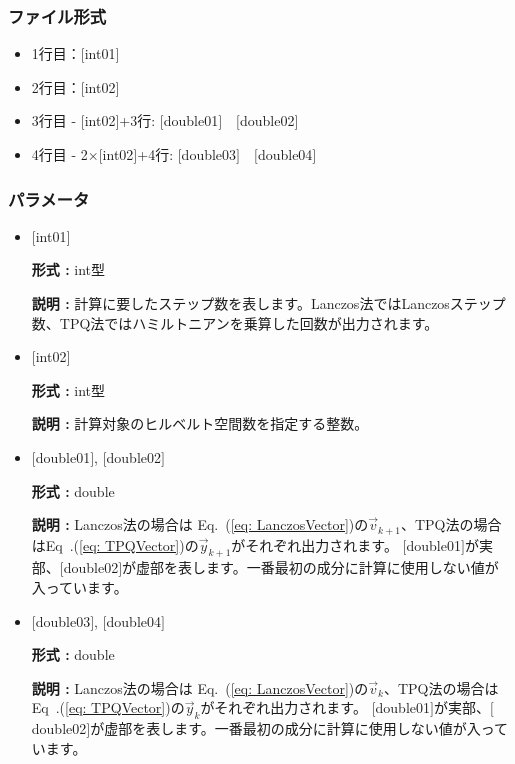 \subsubsection{ファイル形式}
 \begin{itemize}
   \item  1行目：$[$int01$]$
   \item  2行目：$[$int02$]$
   \item  3行目 - $[$int02$]$+3行: $[$double01$]$~~$[$double02$]$
   \item  4行目 - 2$\times$$[$int02$]$+4行: $[$double03$]$~~$[$double04$]$
  \end{itemize}
\subsubsection{パラメータ}
 \begin{itemize}

  \item  $[$int01$]$

 {\bf 形式 :} int型

{\bf 説明 :} { 計算に要したステップ数を表します。Lanczos法ではLanczosステップ数、TPQ法ではハミルトニアンを乗算した回数が出力されます。}

  \item  $[$int02$]$

 {\bf 形式 :} int型

{\bf 説明 :} 計算対象のヒルベルト空間数を指定する整数。
 
  \item  $[$double01$]$, $[$double02$]$ 

 {\bf 形式 :} double 

{\bf 説明 :}  Lanczos法の場合は Eq.~(\ref{eq: LanczosVector})の$\vec{v}_{k+1}$、TPQ法の場合はEq~.(\ref{eq: TPQVector})の$\vec{y}_{k+1}$がそれぞれ出力されます。 $[$double01$]$が実部、$[$double02$]$が虚部を表します。一番最初の成分に計算に使用しない値が入っています。\\

 \item  $[$double03$]$, $[$double04$]$ 

 {\bf 形式 :} double 

{\bf 説明 :}  Lanczos法の場合は Eq.~(\ref{eq: LanczosVector})の$\vec{v}_{k}$、TPQ法の場合はEq~.(\ref{eq: TPQVector})の$\vec{y}_{k}$がそれぞれ出力されます。 $[$double01$]$が実部、$[$double02$]$が虚部を表します。一番最初の成分に計算に使用しない値が入っています。\\


\end{itemize}

